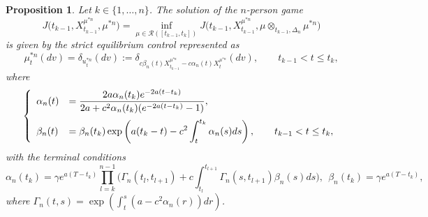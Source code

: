 \documentclass[12pt]{article}
\newtheorem{prop}{Proposition}[section]
\theoremstyle{named}
\numberwithin{equation}{section}
\begin{document}
\begin{prop}
  Let $k\in \{1,\ldots ,n\}$.
  The solution of the $n$-person game
  \begin{equation}
\nonumber %
J\bigl(t_{ k-1 },X^{\mu^{*n} }_{t_{ k-1 }}, \mu^{*n} \bigr) = \inf\limits_{\mu \in \mathcal{R}( [t_{ k-1 },t_k] )} J\bigl(t_{ k-1 },X^{\mu^{*n} }_{t_{ k-1 }}, \mu \otimes_{t_{ k-1 },\Delta_n} \mu^{*n} \bigr)
  \end{equation}
  is given by the strict equilibrium control represented as
\begin{equation}
  \label{mun0}
  \mu^{*n} _t (dv)
  = \delta_{u^{*n}_t} (dv)
  := \delta_{c  \beta_{n} (t) X^{\mu^{*n} }_{t_{ k-1 }} - c  \alpha_{n} (t) X^{\mu^{*n} }_{t}} (dv),
  \qquad t_{ k-1 } < t \leq t_k,
\end{equation}
where
\begin{equation}
   \label{fjklds}
\left\{
  \begin{array}{ll}
    \displaystyle
    \alpha_{n} (t)&=     \displaystyle\frac{2a\alpha_{n} (t_k) e^{-2a (t-t_k)}}{
        2a + c^2\alpha_{n} (t_k) ( e^{-2a (t-t_k)} -1)
    },
    \medskip
 \\
    \displaystyle
    \beta_{n} (t) &=     \displaystyle
    \beta_{n} (t_k)\exp\left(a(t_k-t) -  c^2 \int_t^{t_k} \alpha_{n} (s) ds\right),
    \qquad t_{ k-1 } < t \leq t_k,
  \end{array}
  \right.
\end{equation}
with the terminal conditions
\begin{equation}
  \label{term}
  \alpha_n (t_k) = \gamma e^{a(T-t_k)}\prod\limits_{l=k}^{{n}-1}\bigg( \Gamma_n (t_l, t_{l+1}) + c \int_{t_l}^{t_{l+1}} \Gamma_n (s, t_{l+1})\beta_n(s) ds \bigg),
  \ \ \beta_{n} (t_k) = \gamma e^{a(T-t_k)},
  \end{equation}
where
 $\Gamma_n (t, s) = \exp\left(\int_t^s ( a - c^2 \alpha_n(r) ) dr\right)$.
\end{prop}
\end{document}
